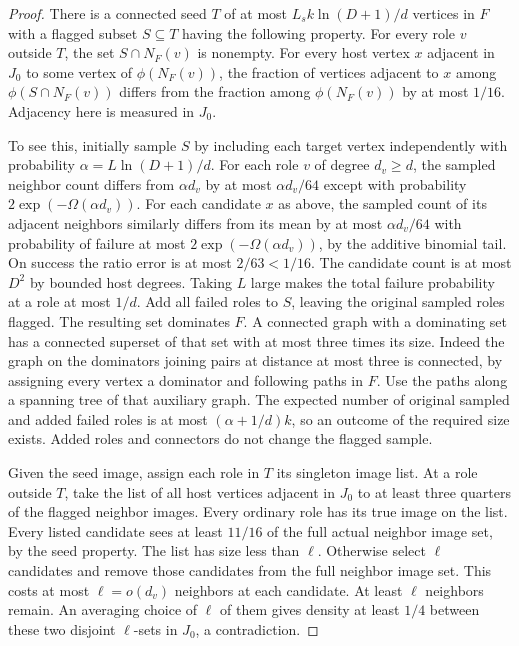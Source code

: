 \documentclass[11pt]{amsart}
\theoremstyle{definition}
\theoremstyle{remark}
\numberwithin{equation}{section}
\begin{document}
\begin{proof}
There is a connected seed $T $ of at most $ L_s k\ln(D+1)/d $ vertices in $ F $ with a flagged subset $ S\subseteq T $ having the following property. For every role $ v $ outside $ T $, the set $ S\cap N_F(v)$ is nonempty. For every host vertex $ x $ adjacent in $ J_0$ to some vertex of $\phi(N_F(v))$, the fraction of vertices adjacent to $ x $ among $\phi(S\cap N_F(v))$ differs from the fraction among $\phi(N_F(v))$ by at most $1/16$. Adjacency here is measured in $ J_0$.

To see this, initially sample $S $ by including each target vertex independently with probability $\alpha=L\ln(D+1)/d $. For each role $ v $ of degree $ d_v\ge d $, the sampled neighbor count differs from $\alpha d_v $ by at most $\alpha d_v/64$ except with probability $2\exp(-\Omega(\alpha d_v))$. For each candidate $ x $ as above, the sampled count of its adjacent neighbors similarly differs from its mean by at most $\alpha d_v/64$ with probability of failure at most $2\exp(-\Omega(\alpha d_v))$, by the additive binomial tail. On success the ratio error is at most $2/63<1/16$. The candidate count is at most $ D^2$ by bounded host degrees. Taking $ L $ large makes the total failure probability at a role at most $1/d $. Add all failed roles to $ S $, leaving the original sampled roles flagged. The resulting set dominates $ F $. A connected graph with a dominating set has a connected superset of that set with at most three times its size. Indeed the graph on the dominators joining pairs at distance at most three is connected, by assigning every vertex a dominator and following paths in $ F $. Use the paths along a spanning tree of that auxiliary graph. The expected number of original sampled and added failed roles is at most $(\alpha+1/d)k$, so an outcome of the required size exists. Added roles and connectors do not change the flagged sample.

Given the seed image, assign each role in $T $ its singleton image list. At a role outside $ T $, take the list of all host vertices adjacent in $ J_0$ to at least three quarters of the flagged neighbor images. Every ordinary role has its true image on the list. Every listed candidate sees at least $11/16$ of the full actual neighbor image set, by the seed property. The list has size less than $\ell $. Otherwise select $\ell $ candidates and remove those candidates from the full neighbor image set. This costs at most $\ell=o(d_v)$ neighbors at each candidate. At least $\ell $ neighbors remain. An averaging choice of $\ell $ of them gives density at least $1/4$ between these two disjoint $\ell $-sets in $ J_0$, a contradiction.


\end{proof}
\end{document}
